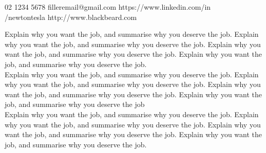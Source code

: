 \documentclass[a4paper,english]{friggeri-letter}
\begin{document}

{
02 1234 5678
}
{
filleremail@gmail.com
}
{
https://www.linkedin.com/in\\/newtontesla
}
{
http://www.blackbeard.com
}




{
\hspace{10mm}Explain why you want the job, and summarise why you deserve the job. Explain why you want the job, and summarise why you deserve the job. Explain why you want the job, and summarise why you deserve the job. Explain why you want the job, and summarise why you deserve the job.\\ 
\vspace{3\parskip}
\hspace{10mm}Explain why you want the job, and summarise why you deserve the job. Explain why you want the job, and summarise why you deserve the job. Explain why you want the job, and summarise why you deserve the job. Explain why you want the job, and summarise why you deserve the job \\ 
\vspace{3\parskip}
\hspace{10mm}Explain why you want the job, and summarise why you deserve the job. Explain why you want the job, and summarise why you deserve the job. Explain why you want the job, and summarise why you deserve the job. Explain why you want the job, and summarise why you deserve the job.\\
}







\opening{
}
\end{document}
